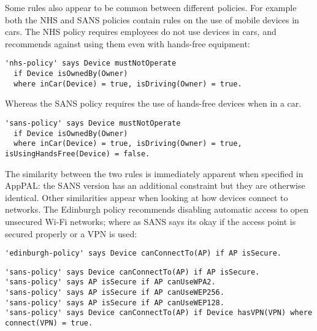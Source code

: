 \documentclass{easychair}
\begin{document}
Some rules also appear to be common between different policies.
For example both the NHS and SANS policies contain rules on the use of mobile devices in cars.
The NHS policy requires employees do not use devices in cars, and recommends against using them even with hands-free equipment:
\begin{lstlisting}[title={\footnotesize\textbf{NHS}:~\itshape ``%
For safety reasons, Trust staff must not use a hand held mobile device whilst driving any vehicle. It is illegal to do so.
Please refer to the most up-to-date information via the Highways Agency.
For safety reasons, Trust staff must not use a hand held mobile device whilst driving any vehicle.
It is illegal to do so. Please refer to the most up-to-date information via the Highways Agency.''}]
'nhs-policy' says Device mustNotOperate 
  if Device isOwnedBy(Owner)
  where inCar(Device) = true, isDriving(Owner) = true.
\end{lstlisting}
Whereas the SANS policy requires the use of hands-free devices when in a car.
\begin{lstlisting}[title={\footnotesize\textbf{SANS}:~\itshape ``%
Conducting telephone calls or utilizing handhelds while driving can be a safety hazard.
Drivers should use handhelds in hand only while parked or out of the vehicle.
If employees must use a handheld device while driving, \emph{Company} requires the use of hands-free headset devices.''}]
'sans-policy' says Device mustNotOperate 
  if Device isOwnedBy(Owner)
  where inCar(Device) = true, isDriving(Owner) = true, isUsingHandsFree(Device) = false.
\end{lstlisting}
The similarity between the two rules is immediately apparent when specified in AppPAL: the SANS version has an additional constraint but they are otherwise identical.
Other similarities appear when looking at how devices connect to networks.
The Edinburgh policy recommends disabling automatic access to open unsecured Wi-Fi networks; where as SANS says its okay if the access point is secured properly or a VPN is used:
\begin{lstlisting}[title={\footnotesize\textbf{Edinburgh}:~\itshape ``Control your devices connections by disabling automatic connection to open, unsecured Wi-Fi networks.''}]
'edinburgh-policy' says Device canConnectTo(AP) if AP isSecure.
\end{lstlisting}
\begin{lstlisting}[title={\footnotesize\textbf{SANS}:~\itshape ``If mobile workers do require connectivity through public, open, or untrusted WLAN, then users MUST use WLANs using, if available and in this order: WPA(2) encryption, WEP 256 bits (or 128 bits), or finally open networks if nothing else is available. Users connected to data networks in an open environment MUST use a VPN connection.''}]
'sans-policy' says Device canConnectTo(AP) if AP isSecure.
'sans-policy' says AP isSecure if AP canUseWPA2.
'sans-policy' says AP isSecure if AP canUseWEP256.
'sans-policy' says AP isSecure if AP canUseWEP128.
'sans-policy' says Device canConnectTo(AP) if Device hasVPN(VPN) where connect(VPN) = true.
\end{lstlisting}
\end{document}
